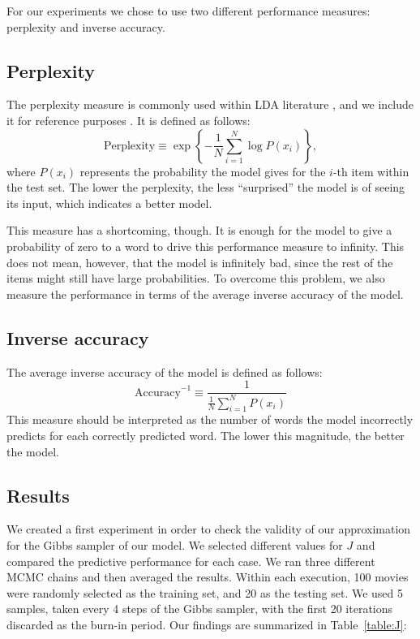 \documentclass{article} %
\begin{document}
For our experiments we chose to use two different performance measures: perplexity and inverse accuracy.

\subsection{Perplexity}

The perplexity measure is commonly used within LDA literature \cite{perplexity}, and we include it for reference purposes . 
It is defined as follows:
\begin{equation}
\text{Perplexity} \equiv \exp \left\{ -\frac{1}{N} \sum_{i = 1}^N \log P(x_i)  \right\},
\end{equation}
where \(P(x_i)\) represents the probability the model gives for the $i$-th item within the test set. The lower the perplexity, the less ``surprised'' the model is of seeing its input, which indicates a better model.

This measure has a shortcoming, though. 
It is enough for the model to give a probability of zero to a word to drive this performance measure to infinity. 
This does not mean, however, that the model is infinitely bad, since the rest of the items might still have large probabilities.
To overcome this problem, we also measure the performance in terms of the average inverse accuracy of the model.

\subsection{Inverse accuracy}

The average inverse accuracy of the model is defined as follows:
\begin{equation}
\text{Accuracy}^{-1} \equiv \frac{1}{\frac{1}{N}\sum_{i = 1}^N P(x_i)}
\end{equation}
This measure should be interpreted as the number of words the model incorrectly predicts for each correctly predicted word. 
The lower this magnitude, the better the model.

\subsection{Results}

We created a first experiment in order to check the validity of our approximation for the Gibbs sampler of our model. 
We selected different values for $J$ and compared the predictive performance for each case. 
We ran three different MCMC chains and then averaged the results. 
Within each execution, 100 movies were randomly selected as the training set, and 20 as the testing set. 
We used 5 samples, taken every 4 steps of the Gibbs sampler, with the first 20 iterations discarded as the burn-in period. 
Our findings are summarized in Table~\ref{table:J}:
\end{document}
